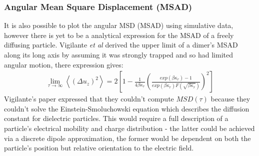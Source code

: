\subsubsection{Angular Mean Square Displacement (MSAD)}
It is also possible to plot the angular MSD (MSAD) using simulative data, however there is yet to be a analytical expression for the MSAD of a freely diffusing particle. Vigilante \textit{et al} \cite{Vigilante2020} derived the upper limit of a dimer's MSAD along its long axis by assuming it was strongly trapped and so had limited angular motion, there expression gives:
\begin{align}
	\lim_{\tau\to\infty}\left<(\Delta u_z)^2\right> = 
	2\left[1-\frac{1}{4\beta\kappa_r} 
	\left(\frac{exp(\beta\kappa_r)-1}
	{exp(\beta\kappa_r)F(\sqrt{\beta\kappa_r})
	}\right)^2\right]
\end{align}  
Vigilante's paper expressed that they couldn't compute $MSD(\tau)$ because they couldn't solve the Einstein-Smoluchowski equation which describes the diffusion constant for dielectric particles. This would require a full description of a particle's electrical mobility and charge distribution - the latter could be achieved via a discrete dipole approximation, the former would be dependent on both the particle's position but relative orientation to the electric field.

